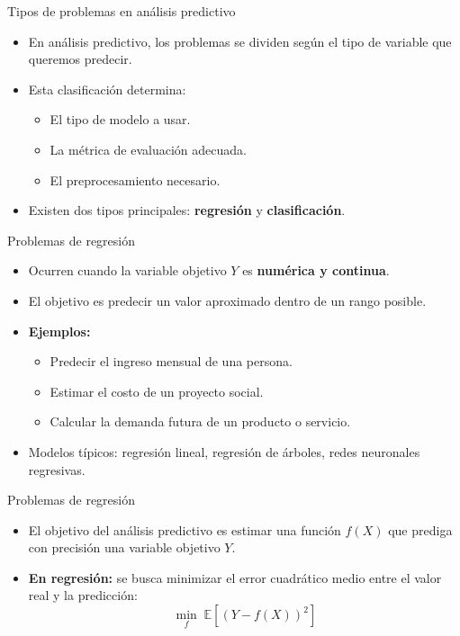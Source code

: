 \documentclass{beamer}
\begin{document}
\begin{frame}{Tipos de problemas en análisis predictivo}
	\begin{itemize}
		\item En análisis predictivo, los problemas se dividen según el tipo de variable que queremos predecir.
		\item Esta clasificación determina:
		\begin{itemize}
			\item El tipo de modelo a usar.
			\item La métrica de evaluación adecuada.
			\item El preprocesamiento necesario.
		\end{itemize}
		\item Existen dos tipos principales: \textbf{regresión} y \textbf{clasificación}.
	\end{itemize}
\end{frame}


\begin{frame}{Problemas de regresión}
	\begin{itemize}
		\item Ocurren cuando la variable objetivo $Y$ es \textbf{numérica y continua}.
		\item El objetivo es predecir un valor aproximado dentro de un rango posible.
		\item \textbf{Ejemplos:}
		\begin{itemize}
			\item Predecir el ingreso mensual de una persona.
			\item Estimar el costo de un proyecto social.
			\item Calcular la demanda futura de un producto o servicio.
		\end{itemize}
		\item Modelos típicos: regresión lineal, regresión de árboles, redes neuronales regresivas.
	\end{itemize}
	\end{frame}

\begin{frame}{Problemas de regresión}	
	\begin{itemize}
		\item El objetivo del análisis predictivo es estimar una función $f(X)$ que prediga con precisión una variable objetivo $Y$.
		
		\item \textbf{En regresión:} se busca minimizar el error cuadrático medio entre el valor real y la predicción:
		\[
		\min_{f} \; \mathbb{E} \left[(Y - f(X))^2\right]
		\]
			\end{itemize}
	\end{frame}
\end{document}
